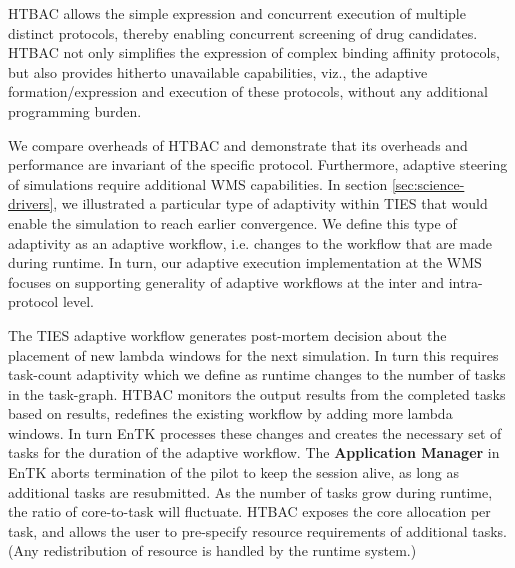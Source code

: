 HTBAC allows the simple expression and concurrent execution of multiple
distinct protocols, thereby enabling concurrent screening of drug candidates.
HTBAC not only simplifies the expression of complex binding affinity
protocols, but also provides hitherto unavailable capabilities, viz., the
adaptive formation/expression and execution of these protocols, without any
additional programming burden. 

We compare overheads of HTBAC and demonstrate that its overheads and
performance are invariant of the specific protocol. Furthermore, adaptive 
steering of simulations require additional WMS capabilities. In section 
\ref{sec:science-drivers}, we illustrated a particular type of adaptivity 
within TIES that would enable the simulation to reach earlier convergence.
We define this type of adaptivity as an adaptive workflow, i.e. changes to the 
workflow that are made during runtime. In turn, our 
adaptive execution implementation at the WMS focuses on supporting generality of 
adaptive workflows at the inter and intra-protocol level. 

The TIES adaptive workflow generates post-mortem decision about the placement
of new lambda windows for the next simulation. In turn this requires task-count 
adaptivity which we define as runtime changes to the
number of tasks in the task-graph. HTBAC monitors the output results from the 
completed tasks based on results, redefines the existing workflow by adding
more lambda windows. In turn EnTK processes these changes and creates the necessary
set of tasks for the duration of the adaptive workflow. The \textbf{Application
Manager} in EnTK aborts termination of the pilot to keep the session alive, as long
as additional tasks are resubmitted. As the number of tasks grow during runtime, the 
ratio of core-to-task will fluctuate. HTBAC exposes the core allocation per task, 
and allows the user to pre-specify resource requirements of additional tasks. 
(Any redistribution of resource is handled by the runtime system.)






